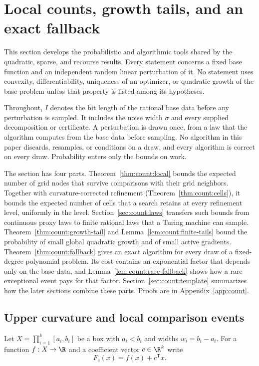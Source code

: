 \section{Local counts, growth tails, and an exact fallback}\label{sec:count}

This section develops the probabilistic and algorithmic tools shared by the
quadratic, sparse, and recourse results. Every statement concerns a fixed
base function and an independent random linear perturbation of it. No
statement uses convexity, differentiability, uniqueness of an optimizer, or
quadratic growth of the base problem unless that property is listed among
its hypotheses.

Throughout, $I$ denotes the bit length of the rational base data before any
perturbation is sampled. It includes the noise width $\sigma$ and every
supplied decomposition or certificate. A perturbation is drawn once, from a
law that the algorithm computes from the base data before sampling. No
algorithm in this paper discards, resamples, or conditions on a draw, and
every algorithm is correct on every draw. Probability enters only the bounds
on work.

The section has four parts. Theorem~\ref{thm:count:local} bounds the
expected number of grid nodes that survive comparisons with their grid
neighbors. Together with curvature-corrected refinement
(Theorem~\ref{thm:count:cells}), it bounds the expected number of cells that
a search retains at every refinement level, uniformly in the level.
Section~\ref{sec:count:laws} transfers such bounds from continuous proxy
laws to finite rational laws that a Turing machine can sample.
Theorem~\ref{thm:count:growth-tail} and Lemma~\ref{lem:count:finite-tails}
bound the probability of small global quadratic growth and of small active
gradients. Theorem~\ref{thm:count:fallback} gives an exact algorithm for
every draw of a fixed-degree polynomial problem. Its cost contains an
exponential factor that depends only on the base data, and
Lemma~\ref{lem:count:rare-fallback} shows how a rare exceptional event pays
for that factor. Section~\ref{sec:count:template} summarizes how the later
sections combine these parts. Proofs are in Appendix~\ref{app:count}.

\subsection{Upper curvature and local comparison events}\label{sec:count:local}

Let $X=\prod_{i=1}^k[a_i,b_i]$ be a box with $a_i<b_i$ and widths
$w_i=b_i-a_i$. For a function $f:X\to\R$ and a coefficient vector
$c\in\R^k$ write
\[
 F_c(x)=f(x)+c^{\mathsf T} x .
\]

